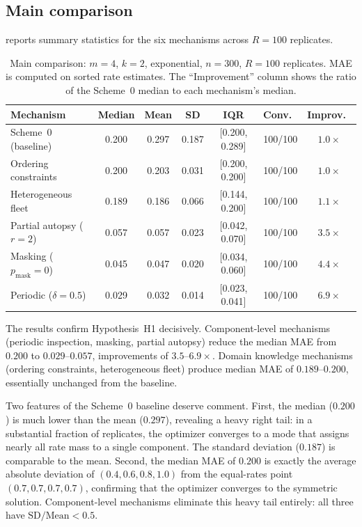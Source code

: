 \documentclass[12pt]{article}
\begin{document}
\subsection{Main comparison}\label{sec:main-comparison}

 reports summary statistics for the six mechanisms
across $R = 100$ replicates.

\begin{table}[t]
\centering
\caption{Main comparison: $m = 4$, $k = 2$, exponential, $n = 300$,
  $R = 100$ replicates.  MAE is computed on sorted rate estimates.
  The ``Improvement'' column shows the ratio of the Scheme~0 median
  to each mechanism's median.}\label{tab:main-results}
\begin{tabular}{@{}lcccccc@{}}
\toprule
Mechanism & Median & Mean & SD & IQR &
  Conv.\ & Improv.\ \\
\midrule
Scheme~0 (baseline) & 0.200 & 0.297 & 0.187 & [0.200, 0.289] &
  100/100 & $1.0\times$ \\
Ordering constraints & 0.200 & 0.203 & 0.031 & [0.200, 0.200] &
  100/100 & $1.0\times$ \\
Heterogeneous fleet & 0.189 & 0.186 & 0.066 & [0.144, 0.200] &
  100/100 & $1.1\times$ \\
Partial autopsy ($r{=}2$) & 0.057 & 0.057 & 0.023 & [0.042, 0.070] &
  100/100 & $3.5\times$ \\
Masking ($p_\text{mask}{=}0$) & 0.045 & 0.047 & 0.020 & [0.034, 0.060] &
  100/100 & $4.4\times$ \\
Periodic ($\delta{=}0.5$) & 0.029 & 0.032 & 0.014 & [0.023, 0.041] &
  100/100 & $6.9\times$ \\
\bottomrule
\end{tabular}
\end{table}

The results confirm Hypothesis~H1 decisively.  Component-level mechanisms
(periodic inspection, masking, partial autopsy) reduce the median MAE
from $0.200$ to $0.029$--$0.057$, improvements of $3.5$--$6.9\times$.
Domain knowledge mechanisms (ordering constraints, heterogeneous fleet)
produce median MAE of $0.189$--$0.200$, essentially unchanged from the
baseline.

Two features of the Scheme~0 baseline deserve comment.  First, the
median ($0.200$) is much lower than the mean ($0.297$), revealing a heavy
right tail: in a substantial fraction of replicates, the optimizer
converges to a mode that assigns nearly all rate mass to a single
component.  The standard deviation ($0.187$) is comparable to the mean.
Second, the median MAE of $0.200$ is exactly the average absolute
deviation of $(0.4, 0.6, 0.8, 1.0)$ from the equal-rates point
$(0.7, 0.7, 0.7, 0.7)$, confirming that the optimizer converges to the
symmetric solution.  Component-level mechanisms eliminate this heavy tail
entirely: all three have $\text{SD}/\text{Mean} < 0.5$.
\end{document}
